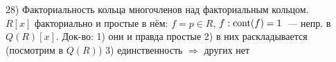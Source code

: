 28) Факториальность кольца многочленов над факториальным кольцом.\\

$R[x]$ факториально и простые в нём: $f = p \in R$, $f: \operatorname{cont}(f) = 1$~--- непр. в $Q(R)[x]$. Док-во: 1) они и правда простые 2) в них раскладывается (посмотрим в $Q(R)$) 3) единственность $\Rightarrow$ других нет\\
